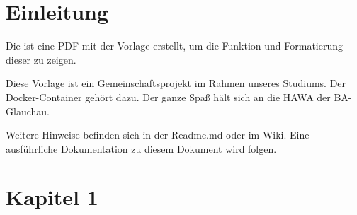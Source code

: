 \section{Einleitung}
Die ist eine PDF mit der Vorlage erstellt, um die Funktion und Formatierung dieser zu zeigen.

Diese Vorlage ist ein Gemeinschaftsprojekt im Rahmen unseres Studiums.
Der Docker-Container gehört dazu.
Der ganze Spaß hält sich an die \ac*{HAWA} der BA-Glauchau.

Weitere Hinweise befinden sich in der Readme.md oder im Wiki.
Eine ausführliche Dokumentation zu diesem Dokument wird folgen.


\section{Kapitel 1}
\blindtext